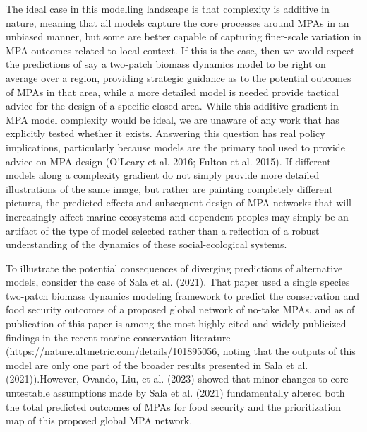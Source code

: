 \documentclass[
  default,
  lineno,
  referee]{sn-jnl}
\begin{document}
The ideal case in this modelling landscape is that complexity is
additive in nature, meaning that all models capture the core processes
around MPAs in an unbiased manner, but some are better capable of
capturing finer-scale variation in MPA outcomes related to local
context. If this is the case, then we would expect the predictions of
say a two-patch biomass dynamics model to be right on average over a
region, providing strategic guidance as to the potential outcomes of
MPAs in that area, while a more detailed model is needed provide
tactical advice for the design of a specific closed area. While this
additive gradient in MPA model complexity would be ideal, we are unaware
of any work that has explicitly tested whether it exists. Answering this
question has real policy implications, particularly because models are
the primary tool used to provide advice on MPA design (O'Leary et al.
2016; Fulton et al. 2015). If different models along a complexity
gradient do not simply provide more detailed illustrations of the same
image, but rather are painting completely different pictures, the
predicted effects and subsequent design of MPA networks that will
increasingly affect marine ecosystems and dependent peoples may simply
be an artifact of the type of model selected rather than a reflection of
a robust understanding of the dynamics of these social-ecological
systems.

To illustrate the potential consequences of diverging predictions of
alternative models, consider the case of Sala et al. (2021). That paper
used a single species two-patch biomass dynamics modeling framework to
predict the conservation and food security outcomes of a proposed global
network of no-take MPAs, and as of publication of this paper is among
the most highly cited and widely publicized findings in the recent
marine conservation literature
(\url{https://nature.altmetric.com/details/101895056}, noting that the
outputs of this model are only one part of the broader results presented
in Sala et al. (2021)).However, Ovando, Liu, et al. (2023) showed that
minor changes to core untestable assumptions made by Sala et al. (2021)
fundamentally altered both the total predicted outcomes of MPAs for food
security and the prioritization map of this proposed global MPA network.
\end{document}
